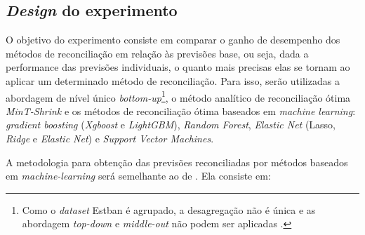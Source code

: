 \documentclass[
  12pt,
  twoside,
  openright,
  a4paper,
  chapter=TITLE,
  section=TITLE,
  brazil]{abntex2}
\begin{document}
\subsection{\texorpdfstring{\emph{Design} do
experimento}{Design do experimento}}\label{design-do-experimento}

O objetivo do experimento consiste em comparar o ganho de desempenho dos
métodos de reconciliação em relação às previsões base, ou seja, dada a
performance das previsões individuais, o quanto mais precisas elas se
tornam ao aplicar um determinado método de reconciliação. Para isso,
serão utilizadas a abordagem de nível único \emph{bottom-up}\footnote{Como
  o \emph{dataset} Estban é agrupado, a desagregação não é única e as
  abordagem \emph{top-down} e \emph{middle-out} não podem ser aplicadas
  \autocite{athanasopoulos_forecast_2023}.}, o método analítico de
reconciliação ótima \emph{MinT-Shrink} e os métodos de reconciliação
ótima baseados em \emph{machine learning}: \emph{gradient boosting}
(\emph{Xgboost} e \emph{LightGBM}), \emph{Random Forest}, \emph{Elastic
Net} (Lasso, \emph{Ridge} e \emph{Elastic Net}) e \emph{Support Vector
Machines}.

A metodologia para obtenção das previsões reconciliadas por métodos
baseados em \emph{machine-learning} será semelhante ao de
\textcite{spiliotis_hierarchical_2021}. Ela consiste em:
\end{document}
